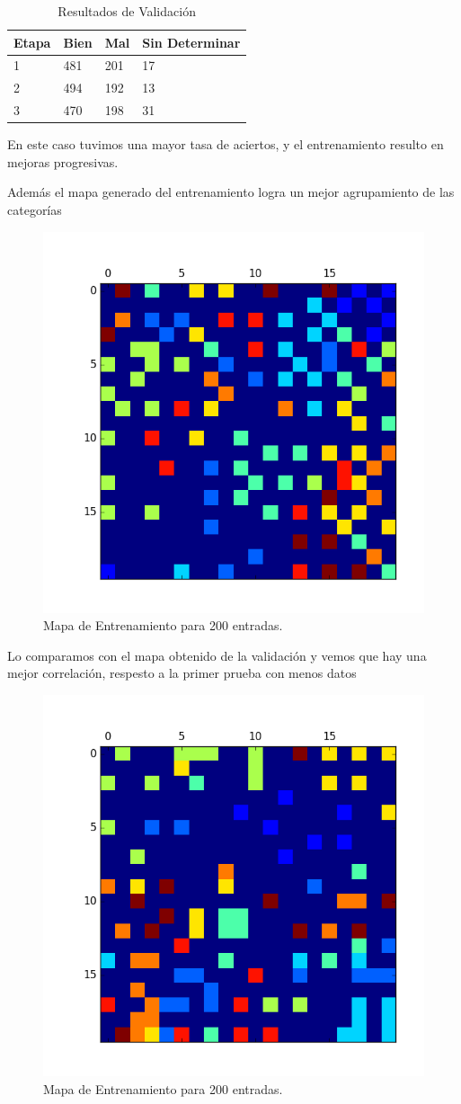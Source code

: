 \begin{table}[htbp]
	\begin{center}
	\begin{tabular}{|l|l|l|l|}
		\hline
		Etapa & Bien & Mal & Sin Determinar 	\\
							\hline \hline
		1     & 481  & 201 & 17 		\\ \hline
		2     & 494  & 192 & 13 		\\ \hline
		3     & 470  & 198 & 31			\\ \hline
	\end{tabular}
	\caption{Resultados de Validación}
	\label{tabla:entrenamiento 50 entradas}
	\end{center}
\end{table}


En este caso tuvimos una mayor tasa de aciertos, y el entrenamiento resulto
en mejoras progresivas.

Además el mapa generado del entrenamiento logra un mejor agrupamiento de las
categorías

\begin{figure}[H]
  \centering
  \includegraphics[width=0.5\columnwidth]{secciones/graficos/kohonen/mapaentrenamiento200.png}
  \caption{Mapa de Entrenamiento para 200 entradas.}
  \label{fig:mapa train 200}
\end{figure}


Lo comparamos con el mapa obtenido de la validación y vemos que hay una mejor correlación,
respesto a la primer prueba con menos datos

\begin{figure}[H]
  \centering
  \includegraphics[width=0.5\columnwidth]{secciones/graficos/kohonen/mapavalidacion200.png}
  \caption{Mapa de Entrenamiento para 200 entradas.}
  \label{fig:mapa train 200}
\end{figure}



